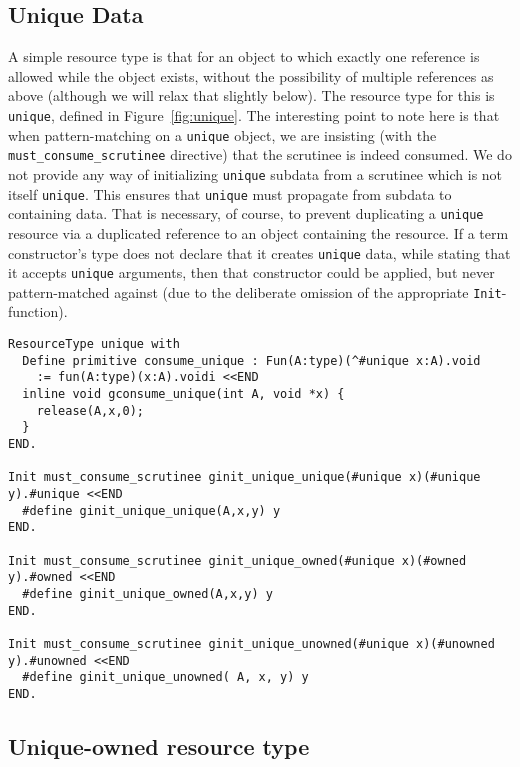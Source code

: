 \documentclass[9pt,natbib]{sigplanconf}
\begin{document}
\subsection{Unique Data}

A simple resource type is that for an object to which exactly one
reference is allowed while the object exists, without the possibility
of multiple references as above (although we will relax that slightly
below).  The resource type for this is \texttt{unique}, defined in
Figure~\ref{fig:unique}.  The interesting point to note here is that
when pattern-matching on a \texttt{unique} object, we are insisting
(with the \texttt{must\_consume\_scrutinee} directive) that the
scrutinee is indeed consumed.  We do not provide any way of
initializing \texttt{unique} subdata from a scrutinee which is not
itself \texttt{unique}.  This ensures that \texttt{unique} must
propagate from subdata to containing data.  That is necessary, of
course, to prevent duplicating a \texttt{unique} resource via a
duplicated reference to an object containing the resource.  If a term
constructor's type does not declare that it creates \texttt{unique}
data, while stating that it accepts \texttt{unique} arguments, then
that constructor could be applied, but never pattern-matched against
(due to the deliberate omission of the appropriate
\texttt{Init}-function).

\begin{figure*}
\small
\begin{verbatim}
ResourceType unique with
  Define primitive consume_unique : Fun(A:type)(^#unique x:A).void
    := fun(A:type)(x:A).voidi <<END
  inline void gconsume_unique(int A, void *x) {
    release(A,x,0);
  }
END.

Init must_consume_scrutinee ginit_unique_unique(#unique x)(#unique y).#unique <<END
  #define ginit_unique_unique(A,x,y) y
END.

Init must_consume_scrutinee ginit_unique_owned(#unique x)(#owned y).#owned <<END
  #define ginit_unique_owned(A,x,y) y
END.

Init must_consume_scrutinee ginit_unique_unowned(#unique x)(#unowned y).#unowned <<END
  #define ginit_unique_unowned( A, x, y) y
END.
\end{verbatim}
\caption{The \texttt{unique} resource type}
\label{fig:unique}
\end{figure*}

\subsection{Unique-owned resource type}
\end{document}
